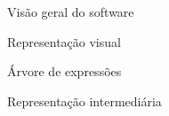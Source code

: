 \begin{frame}{Visão geral do software}

\end{frame} 

\begin{frame}{Representação visual}

\end{frame}

\begin{frame}{Árvore de expressões}

\end{frame}

\begin{frame}{Representação intermediária}

\end{frame}




